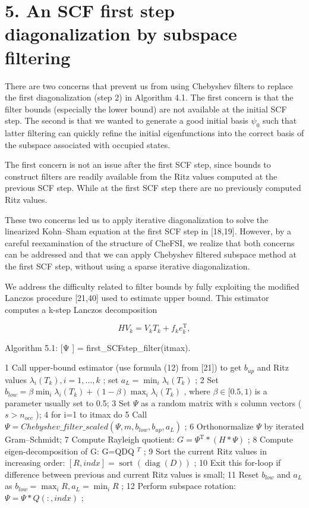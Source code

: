 \documentclass[
  10
]{article}
\begin{document}
\section{5. An SCF first step diagonalization by subspace
filtering}\label{an-scf-first-step-diagonalization-by-subspace-filtering}

There are two concerns that prevent us from using Chebyshev filters to
replace the first diagonalization (step 2) in Algorithm 4.1. The first
concern is that the filter bounds (especially the lower bound) are not
available at the initial SCF step. The second is that we wanted to
generate a good initial basis \(\psi _ { 0 }\) such that latter
filtering can quickly refine the initial eigenfunctions into the correct
basis of the subspace associated with occupied states.

The first concern is not an issue after the first SCF step, since bounds
to construct filters are readily available from the Ritz values computed
at the previous SCF step. While at the first SCF step there are no
previously computed Ritz values.

These two concerns led us to apply iterative diagonalization to solve
the linearized Kohn--Sham equation at the first SCF step in {[}18,19{]}.
However, by a careful reexamination of the structure of CheFSI, we
realize that both concerns can be addressed and that we can apply
Chebyshev filtered subspace method at the first SCF step, without using
a sparse iterative diagonalization.

We address the difficulty related to filter bounds by fully exploiting
the modified Lanczos procedure {[}21,40{]} used to estimate upper bound.
This estimator computes a k-step Lanczos decomposition

\[
H V _ {k} = V _ {k} T _ {k} + f _ {k} e _ {k} ^ {\mathrm{T}}, \tag {11}
\]

Algorithm 5.1: {[}Ψ {]} = first\_SCFstep\_filter(itmax).

1 Call upper-bound estimator (use formula (12) from {[}21{]}) to get
\(b_{up}\) and Ritz values \(\lambda_{i}(T_{k}), i=1,\ldots,k\) ; set
\(a_{L}=\min_{i}\lambda_{i}(T_{k})\) ; 2 Set
\(b_{low}=\beta\min_{i}\lambda_{i}(T_{k})+(1-\beta)\max_{i}\lambda_{i}(T_{k})\)
, where \(\beta\in[0.5,1)\) is a parameter usually set to 0.5; 3 Set
\(\Psi\) as a random matrix with s column vectors ( \(s>n_{occ}\) ); 4
for i=1 to itmax do 5 Call
\(\Psi=Chebyshev\_filter\_scaled(\Psi,m,b_{low},b_{up},a_{L})\) ; 6
Orthonormalize \(\Psi\) by iterated Gram--Schmidt; 7 Compute Rayleigh
quotient: \(G=\Psi^{\mathrm{T}}*(H*\Psi)\) ; 8 Compute
eigen-decomposition of G: G=QDQ \(^{T}\) ; 9 Sort the current Ritz
values in increasing order:
\([R,indx]=\operatorname{sort}(\operatorname{diag}(D))\) ; 10 Exit this
for-loop if difference between previous and current Ritz values is
small; 11 Reset \(b_{low}\) and \(a_{L}\) as
\(b_{low}=\max_{i}R,a_{L}=\min_{i}R\) ; 12 Perform subspace rotation:
\(\Psi=\Psi*Q(:,indx)\) ;
\end{document}
